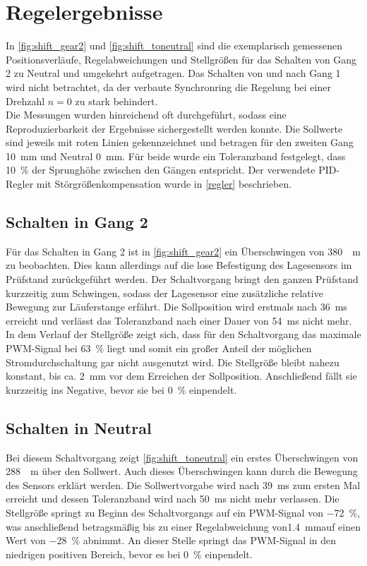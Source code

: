 \section{Regelergebnisse} \label{reglerergebnisse}
In \autoref{fig:shift_gear2} und \autoref{fig:shift_toneutral} sind die exemplarisch gemessenen Positionsverläufe, Regelabweichungen und Stellgrößen für das Schalten von Gang 2 zu Neutral und umgekehrt aufgetragen. Das Schalten von und nach Gang 1 wird nicht betrachtet, da der verbaute Synchronring die Regelung bei einer Drehzahl $n=0$ zu stark behindert.\\
Die Messungen wurden hinreichend oft durchgeführt, sodass eine Reproduzierbarkeit der Ergebnisse sichergestellt werden konnte. Die Sollwerte sind jeweils mit roten Linien gekennzeichnet und betragen für den zweiten Gang \SI{10}{mm} und Neutral \SI{0}{mm}. Für beide wurde ein Toleranzband festgelegt, dass \SI{10}{\%} der Sprunghöhe zwischen den Gängen entspricht. Der verwendete PID-Regler mit Störgrößenkompensation wurde in \autoref{regler} beschrieben.

\subsection{Schalten in Gang 2}

Für das Schalten in Gang 2 ist in \autoref{fig:shift_gear2} ein Überschwingen von \SI{380}{\mu m} zu beobachten. Dies kann allerdings auf die lose Befestigung des Lagesensors im Prüfstand zurückgeführt werden. Der Schaltvorgang bringt den ganzen Prüfstand kurzzeitig zum Schwingen, sodass der Lagesensor eine zusätzliche relative Bewegung zur Läuferstange erfährt. Die Sollposition wird erstmals nach \SI{36}{ms} erreicht und verlässt das Toleranzband nach einer Dauer von \SI{54}{ms} nicht mehr. In dem Verlauf der Stellgröße zeigt sich, dass für den Schaltvorgang das maximale PWM-Signal bei \SI{63}{\%} liegt und somit ein großer Anteil der möglichen Stromdurchschaltung gar nicht ausgenutzt wird. Die Stellgröße bleibt nahezu konstant, bis ca. \SI{2}{mm} vor dem Erreichen der Sollposition. Anschließend fällt sie kurzzeitig ins Negative, bevor sie bei \SI{0}{\%} einpendelt.  

\subsection{Schalten in Neutral}
Bei diesem Schaltvorgang zeigt \autoref{fig:shift_toneutral} ein erstes Überschwingen von \SI{288}{\mu m} über den Sollwert. Auch dieses Überschwingen kann durch die Bewegung des Sensors erklärt werden. Die Sollwertvorgabe wird nach \SI{39}{ms} zum ersten Mal erreicht und dessen Toleranzband wird nach \SI{50}{ms} nicht mehr verlassen. Die Stellgröße springt zu Beginn des Schaltvorgangs auf ein PWM-Signal von \SI{-72}{\%}, was anschließend betragsmäßig bis zu einer Regelabweichung von\SI{1,4}{mm}auf einen Wert von \SI{-28}{\%} abnimmt. An dieser Stelle springt das PWM-Signal in den niedrigen positiven Bereich, bevor es bei \SI{0}{\%} einpendelt.

